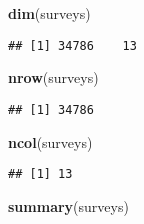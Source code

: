 \documentclass[]{article}
\newenvironment{Shaded}{\begin{snugshade}}{\end{snugshade}}
\newcommand{\KeywordTok}[1]{\textcolor[rgb]{0.13,0.29,0.53}{\textbf{#1}}}
\newcommand{\NormalTok}[1]{#1}
\begin{document}
\begin{Shaded}
\begin{Highlighting}[]
\KeywordTok{dim}\NormalTok{(surveys)}
\end{Highlighting}
\end{Shaded}

\begin{verbatim}
## [1] 34786    13
\end{verbatim}

\begin{Shaded}
\begin{Highlighting}[]
\KeywordTok{nrow}\NormalTok{(surveys)}
\end{Highlighting}
\end{Shaded}

\begin{verbatim}
## [1] 34786
\end{verbatim}

\begin{Shaded}
\begin{Highlighting}[]
\KeywordTok{ncol}\NormalTok{(surveys)}
\end{Highlighting}
\end{Shaded}

\begin{verbatim}
## [1] 13
\end{verbatim}

\begin{Shaded}
\begin{Highlighting}[]
\KeywordTok{summary}\NormalTok{(surveys)}
\end{Highlighting}
\end{Shaded}
\end{document}
